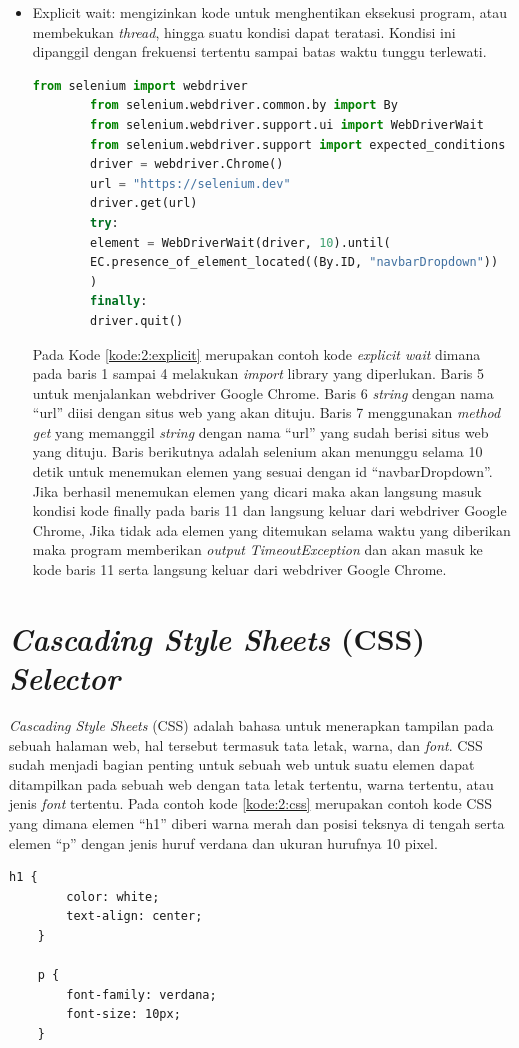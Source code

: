 \begin{itemize}
	\item Explicit wait: mengizinkan kode untuk menghentikan eksekusi program, atau membekukan \textit{thread}, hingga suatu kondisi dapat teratasi. Kondisi ini dipanggil dengan frekuensi tertentu sampai batas waktu tunggu terlewati.
	\begin{lstlisting}[language=python, caption=Contoh kode Explicit wait, label=kode:2:explicit]
		from selenium import webdriver
		from selenium.webdriver.common.by import By
		from selenium.webdriver.support.ui import WebDriverWait
		from selenium.webdriver.support import expected_conditions as EC
		driver = webdriver.Chrome()
		url = "https://selenium.dev"
		driver.get(url)	
		try:
		element = WebDriverWait(driver, 10).until(
		EC.presence_of_element_located((By.ID, "navbarDropdown"))
		)
		finally:
		driver.quit()
	\end{lstlisting}
	Pada Kode \ref{kode:2:explicit} merupakan contoh kode \textit{explicit wait} dimana pada baris 1 sampai 4 melakukan \textit{import} library yang diperlukan. Baris 5 untuk menjalankan webdriver Google Chrome. Baris 6 \textit{string} dengan nama ``url'' diisi dengan situs web yang akan dituju. Baris 7 menggunakan \textit{method get} yang memanggil \textit{string} dengan nama ``url'' yang sudah berisi situs web yang dituju. Baris berikutnya adalah selenium akan menunggu selama 10 detik untuk menemukan elemen yang sesuai dengan id ``navbarDropdown''. Jika berhasil menemukan elemen yang dicari maka akan langsung masuk kondisi kode finally pada baris 11 dan langsung keluar dari webdriver Google Chrome, Jika tidak ada elemen yang ditemukan selama waktu yang diberikan maka program memberikan \textit{output} \textit{TimeoutException} dan akan masuk ke kode baris 11 serta langsung keluar dari webdriver Google Chrome.	
\end{itemize}

\section{\textit{Cascading Style Sheets} (CSS) \textit{Selector}}
\label{sec:css}
\textit{Cascading Style Sheets} (CSS) adalah bahasa untuk menerapkan tampilan pada sebuah halaman web, hal tersebut termasuk tata letak, warna, dan \textit{font}\cite{css}. CSS sudah menjadi bagian penting untuk sebuah web untuk suatu elemen dapat ditampilkan pada sebuah web dengan tata letak tertentu, warna tertentu, atau jenis \textit{font} tertentu. Pada contoh kode \ref{kode:2:css} merupakan contoh kode CSS yang dimana elemen ``h1'' diberi warna merah dan posisi teksnya di tengah serta elemen ``p'' dengan jenis huruf verdana dan ukuran hurufnya 10 pixel.
\newpage
\begin{lstlisting}[caption=Contoh kode CSS, label=kode:2:css]
	h1 {
		color: white;
		text-align: center;
	}

	p {
		font-family: verdana;
		font-size: 10px;
	}
\end{lstlisting}

